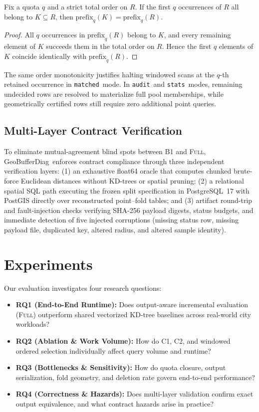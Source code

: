 \documentclass[sigconf, nonacm]{acmart}
\newcommand{\sys}{GeoBufferDiag}
\newcommand{\full}{\textsc{Full}}
\newcommand{\matched}{\texttt{matched}}
\newcommand{\audit}{\texttt{audit}}
\newcommand{\stats}{\texttt{stats}}
\begin{document}
\begin{proposition}
Fix a quota $q$ and a strict total order on $R$. If the first $q$ occurrences of $R$ all belong to $K\subseteq R$, then $\mathrm{prefix}_q(K)=\mathrm{prefix}_q(R)$.
\end{proposition}
\begin{proof}
All $q$ occurrences in $\mathrm{prefix}_q(R)$ belong to $K$, and every remaining element of $K$ succeeds them in the total order on $R$. Hence the first $q$ elements of $K$ coincide identically with $\mathrm{prefix}_q(R)$.
\end{proof}

The same order monotonicity justifies halting windowed scans at the $q$-th retained occurrence in \matched\ mode. In \audit\ and \stats\ modes, remaining undecided rows are resolved to materialize full pool memberships, while geometrically certified rows still require zero additional point queries.

\subsection{Multi-Layer Contract Verification}
\label{sec:verification}
To eliminate mutual-agreement blind spots between B1 and \full, \sys\ enforces contract compliance through three independent verification layers: (1) an exhaustive float64 oracle that computes chunked brute-force Euclidean distances without KD-trees or spatial pruning; (2) a relational spatial SQL path executing the frozen split specification in PostgreSQL~17 with PostGIS directly over reconstructed point--fold tables; and (3) artifact round-trip and fault-injection checks verifying SHA-256 payload digests, status budgets, and immediate detection of five injected corruptions (missing status row, missing payload file, duplicated key, altered radius, and altered sample identity).

\section{Experiments}
Our evaluation investigates four research questions:
\begin{itemize}
\item \textbf{RQ1 (End-to-End Runtime):} Does output-aware incremental evaluation (\full) outperform shared vectorized KD-tree baselines across real-world city workloads?
\item \textbf{RQ2 (Ablation \& Work Volume):} How do C1, C2, and windowed ordered selection individually affect query volume and runtime?
\item \textbf{RQ3 (Bottlenecks \& Sensitivity):} How do quota closure, output serialization, fold geometry, and deletion rate govern end-to-end performance?
\item \textbf{RQ4 (Correctness \& Hazards):} Does multi-layer validation confirm exact output equivalence, and what contract hazards arise in practice?
\end{itemize}
\end{document}
